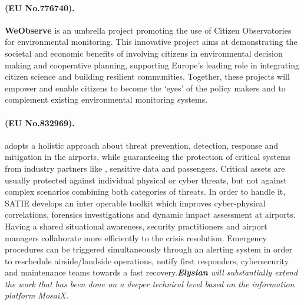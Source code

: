 \documentclass[a4paper,11pt]{article}
\newcommand{\project}[1]{\textbf{#1}\xspace}
\newcommand{\SECURITY}{\project{Elysian}}
\newcommand{\TheProject}{\SECURITY}
\begin{document}
\begin{mdframed}[backgroundcolor=blue!5]
\paragraph{\weobserve (EU No.776740).}
\textbf{WeObserve} is an umbrella project promoting the use of Citizen Observatories for environmental monitoring.  This innovative project aims at demonstrating the societal and economic benefits of involving citizens in environmental decision making and cooperative planning, supporting Europe’s leading role in integrating citizen science and building resilient communities. Together, these projects will empower and enable citizens to become the ‘eyes’ of the policy makers and to complement existing environmental monitoring systems.
\end{mdframed}

\begin{mdframed}[backgroundcolor=blue!5]
\paragraph{\satie (EU No.832969).}
\satie adopts a holistic approach about threat prevention, detection, response and mitigation in the airports, while guaranteeing the protection of critical systems from industry partners like \FRQshort{}, sensitive data and passengers. Critical assets are usually protected against individual physical or cyber threats, but not against complex scenarios combining both categories of threats. In order to handle it, SATIE develops an inter operable toolkit which improves cyber-physical correlations, forensics investigations and dynamic impact assessment at airports. Having a shared situational awareness, security practitioners and airport managers collaborate more efficiently to the crisis resolution. Emergency procedures can be triggered simultaneously through an alerting system in order to reschedule airside/landside operations, notify first responders, cybersecurity and maintenance teams towards a fast recovery.\emph{\TheProject will substantially extend the work that has been done on a deeper technical level based on the information platform MosaiX.}
\end{mdframed}
\end{document}
